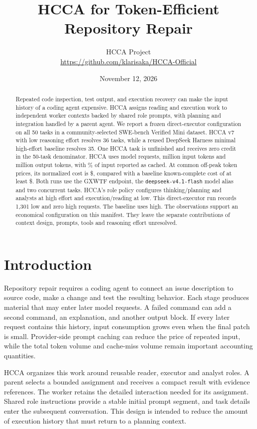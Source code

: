 \documentclass[10pt,a4paper]{article}
\title{\textbf{HCCA for Token-Efficient\\Repository Repair}}
\author{HCCA Project\\\small\url{https://github.com/klarisaka/HCCA-Official}}
\date{November 12, 2026}
\begin{document}
\maketitle
\thispagestyle{plain}

\begin{abstract}
Repeated code inspection, test output, and execution recovery can make the input
history of a coding agent expensive. HCCA assigns reading and execution work to
independent worker contexts backed by shared role prompts, with planning and
integration handled by a parent agent. We report a frozen direct-executor
configuration on all 50 tasks in a community-selected SWE-bench Verified Mini
dataset. HCCA v7 with low reasoning effort resolves 36 tasks, while a reused
DeepSeek Harness minimal high-effort baseline resolves 35. One HCCA task is
unfinished and receives zero credit in
the 50-task denominator. HCCA uses \HRequests{} model requests,
\HInputM{} million input tokens and \HOutputM{} million output tokens, with
\HCachePct{}\% of input reported as cached. At common off-peak token prices,
its normalized cost is \$\HCost{}, compared with a baseline known-complete
cost of at least \$\BCost{}. Both runs use the GXWTF endpoint, the
\texttt{deepseek-v4.1-flash} model alias and two concurrent tasks. HCCA's role
policy configures thinking/planning and analysts at high effort and
execution/reading at low. This direct-executor run records 1,301 low and zero
high requests. The baseline uses high. The observations support
an economical configuration on this manifest. They leave the separate
contributions of context design, prompts, tools and reasoning effort unresolved.
\end{abstract}

\section{Introduction}

Repository repair requires a coding agent to connect an issue description to
source code, make a change and test the resulting behavior. Each stage produces
material that may enter later model requests. A failed command can add a second
command, an explanation, and another output block. If every later request
contains this history, input consumption grows even when the final patch is
small. Provider-side prompt caching can reduce the price of repeated input,
while the total token volume and cache-miss volume remain important accounting
quantities.

HCCA organizes this work around reusable reader, executor and analyst roles.
A parent selects a bounded assignment and receives a compact result with
evidence references. The worker retains the detailed interaction needed for its
assignment. Shared role instructions provide a stable initial prompt segment,
and task details enter the subsequent conversation. This design is intended to
reduce the amount of execution history that must return to a planning context.
\end{document}
